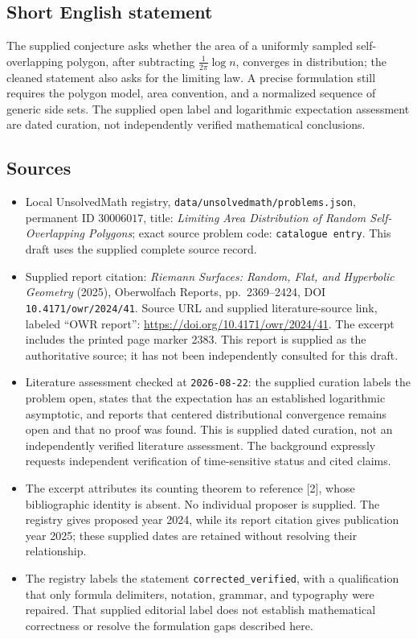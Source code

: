 \documentclass[11pt]{article}
\begin{document}
\subsection{Short English statement}
The supplied conjecture asks whether the area of a uniformly sampled self-overlapping polygon, after subtracting \(\frac{1}{2\pi}\log n\), converges in distribution; the cleaned statement also asks for the limiting law. A precise formulation still requires the polygon model, area convention, and a normalized sequence of generic side sets. The supplied open label and logarithmic expectation assessment are dated curation, not independently verified mathematical conclusions.
\subsection{Sources}
\begin{itemize}
\item Local UnsolvedMath registry, \texttt{data/unsolvedmath/problems.json}, permanent ID \(30006017\), title: \emph{Limiting Area Distribution of Random Self-Overlapping Polygons}; exact source problem code: \texttt{catalogue entry}. This draft uses the supplied complete source record.
\item Supplied report citation: \emph{Riemann Surfaces: Random, Flat, and Hyperbolic Geometry} (2025), Oberwolfach Reports, pp.\ 2369--2424, DOI \texttt{10.4171/owr/2024/41}. Source URL and supplied literature-source link, labeled ``OWR report'': \url{https://doi.org/10.4171/owr/2024/41}. The excerpt includes the printed page marker 2383. This report is supplied as the authoritative source; it has not been independently consulted for this draft.
\item Literature assessment checked at \texttt{2026-08-22}: the supplied curation labels the problem open, states that the expectation has an established logarithmic asymptotic, and reports that centered distributional convergence remains open and that no proof was found. This is supplied dated curation, not an independently verified literature assessment. The background expressly requests independent verification of time-sensitive status and cited claims.
\item The excerpt attributes its counting theorem to reference [2], whose bibliographic identity is absent. No individual proposer is supplied. The registry gives proposed year 2024, while its report citation gives publication year 2025; these supplied dates are retained without resolving their relationship.
\item The registry labels the statement \texttt{corrected\_verified}, with a qualification that only formula delimiters, notation, grammar, and typography were repaired. That supplied editorial label does not establish mathematical correctness or resolve the formulation gaps described here.
\end{itemize}
\end{document}

